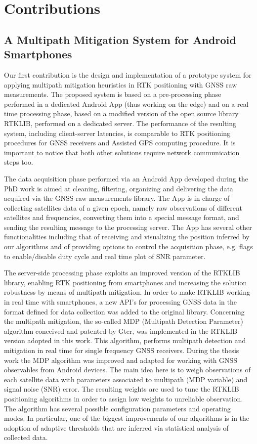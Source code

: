 \section{Contributions}
%

\subsection*{A Multipath Mitigation System for Android Smartphones}
Our first contribution is the design and implementation of a 
prototype system for applying multipath mitigation heuristics in RTK positioning with GNSS raw measurements.
The proposed system is based on a pre-processing phase performed in a dedicated Android App (thus working on the edge) and on a real time processing phase, based on a modified version of the open source library RTKLIB, performed on a dedicated server.
The performance of the resulting system, including client-server latencies, is comparable to RTK positioning procedures for GNSS receivers and Assisted GPS computing procedure. It is important to notice that both other solutions require network communication steps too.

%
The data acquisition phase performed via an Android App developed during the PhD work is aimed at cleaning, filtering, organizing and delivering the data acquired via the GNSS raw measurements library. The App is in charge of collecting satellites data of a given epoch, namely raw observations of different satellites and frequencies, converting them into a special message format, and sending the resulting message to the processing server.
The App has several other functionalities including that of receiving and visualizing the position inferred by our algorithms and of providing options to control the acquisition phase, e.g. flags to enable/disable duty cycle and real time plot of SNR parameter.

The server-side processing phase exploits an improved version of the RTKLIB library, enabling RTK positioning from smartphones and increasing the solution robustness by means of multipath mitigation. 
In order to make RTKLIB working in real time with smartphones, a new API's for processing GNSS data in the format defined for data collection was added to the original library.
Concerning the multipath mitigation, the so-called MDP (Multipath Detection Parameter) algorithm conceived and patented by Gter, was implemented in the RTKLIB version adopted in this work. This algorithm, performs multipath detection and mitigation in real time for single frequency GNSS receivers.
During the thesis work the MDP algorithm was improved and adapted for working with GNSS observables from Android devices. The main idea here is to weigh observations of each satellite data with parameters associated to multipath (MDP variable) and signal noise (SNR) error.
The resulting weights are used to tune the RTKLIB positioning algorithms in order to assign low weights to unreliable observation.
The algorithm has several possible configuration parameters and operating modes. In particular, one of the biggest improvements of our algorithms is in the adoption of adaptive thresholds that are inferred via statistical analysis of collected data.
%
